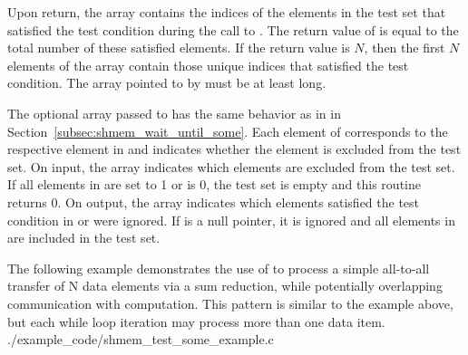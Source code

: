\begin{apidefinition}
{    Upon return, the  array contains the indices of the elements
    in the test set that satisfied the test condition during the call to
    .  The return value of  is
    equal to the total number of these satisfied elements.  If the return value
    is $N$, then the first $N$ elements of the  array contain
    those unique indices that satisfied the test condition.  The array pointed
    to by  must be at least  long.

    The optional  array passed to  has the
    same behavior as in  in
    Section~\ref{subsec:shmem_wait_until_some}.   Each element of 
    corresponds to the respective element in  and indicates whether
    the element is excluded from the test set.  On input, the 
    array indicates which elements are excluded from the test set.  If all
    elements in  are set to 1 or  is 0, the test set is
    empty and this routine returns 0.  On output, the  array
    indicates which elements satisfied the test condition in  or
    were ignored.  If  is a null pointer, it is ignored and all
    elements in  are included in the test set.
}



\begin{apiexamples}
  \apicexample
      {The following \CorCpp{} example demonstrates the use of
       to process a simple all-to-all transfer of N
      data elements via a sum reduction, while potentially overlapping
      communication with computation.  This pattern is similar to the
       example above, but each while loop iteration may
      process more than one data item.}
      {./example_code/shmem_test_some_example.c}
      {}
\end{apiexamples}

\end{apidefinition}
